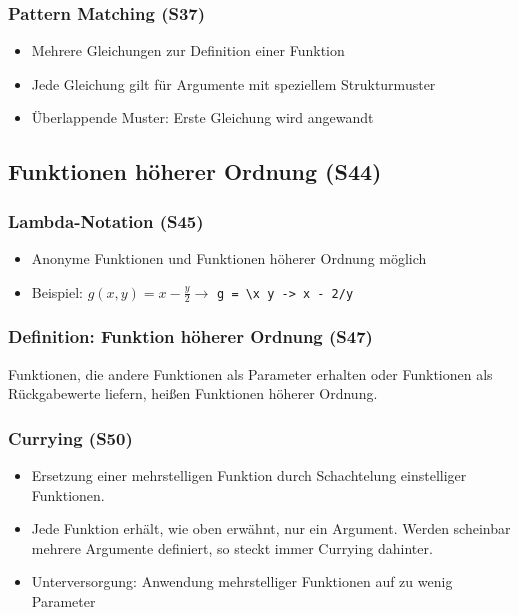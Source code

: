 \subsubsection{Pattern Matching (S37)}
\begin{itemize}
	\item Mehrere Gleichungen zur Definition einer Funktion
	\item Jede Gleichung gilt für Argumente mit speziellem Strukturmuster
	\item Überlappende Muster: Erste Gleichung wird angewandt
\end{itemize}


\subsection{Funktionen höherer Ordnung (S44)}

\subsubsection{Lambda-Notation (S45)}
\begin{itemize}
	\item Anonyme Funktionen und Funktionen höherer Ordnung möglich
	\item Beispiel: \(g(x,y)=x-\frac{y}{2} \longrightarrow\) \texttt{g = \textbackslash x y -> x - 2/y}
\end{itemize}

\subsubsection{Definition: Funktion höherer Ordnung (S47)}
Funktionen, die andere Funktionen als Parameter erhalten oder Funktionen als Rückgabewerte liefern, heißen Funktionen höherer Ordnung.

\subsubsection{Currying (S50)}
\begin{itemize}
	\item Ersetzung einer mehrstelligen Funktion durch Schachtelung einstelliger Funktionen.
	\item Jede Funktion erhält, wie oben erwähnt, nur ein Argument. Werden scheinbar mehrere Argumente definiert, so steckt immer Currying dahinter.
	\item Unterversorgung: Anwendung mehrstelliger Funktionen auf zu wenig Parameter
\end{itemize}

